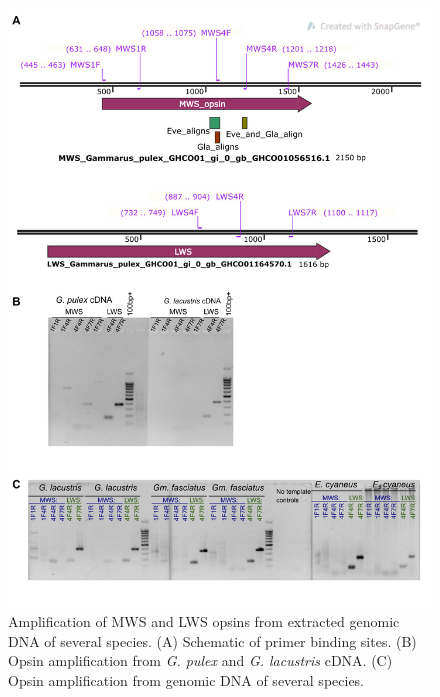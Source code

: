 \documentclass{article}
\begin{document}
\begin{figure}[H] 
	\includegraphics[scale=0.75]{./FigS3_gDNA_PCR_Gmfa_Ecy_Gla.png}
	\caption{Amplification of MWS and LWS opsins from extracted genomic DNA of several species. (A) Schematic of primer binding sites. (B) Opsin amplification from \textit{G. pulex} and \textit{G. lacustris} cDNA. (C) Opsin amplification from genomic DNA of several species.} \end{figure}
\end{document}
